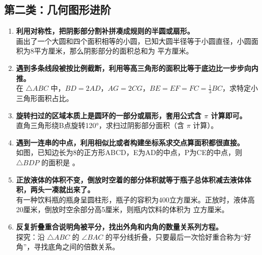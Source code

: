\documentclass{ctexart}
\begin{document}
\subsection*{第二类：几何图形进阶}
\begin{enumerate}
    \item \textbf{利用对称性，把阴影部分割补拼凑成规则的半圆或扇形。} \\
    画出了一个大圆和四个面积相等的小圆，已知大圆半径等于小圆直径，小圆面积为8平方厘米，那么阴影部分的面积总和为 \underline{\hspace{2cm}} 平方厘米。
    \vspace{2cm}
    \vspace{2cm}
    \item \textbf{遇到多条线段被按比例截断，利用等高三角形的面积比等于底边比一步步向内推。} \\
    在 $\triangle ABC$ 中，$BD=2AD$，$AG=2CG$，$BE=EF=FC=\frac{1}{3}BC$，求特定小三角形面积占比。
    \vspace{2cm}
    \vspace{2cm}
    \item \textbf{旋转扫过的区域本质上是圆环的一部分或扇形，套用公式含 $\pi$ 计算即可。} \\
    直角三角形绕B点旋转120°，求扫过阴影部分面积（含 $\pi$ 计算）。
    \vspace{2cm}
    \vspace{2cm}
    \item \textbf{遇到一连串的中点，利用相似比或者构建坐标系求交点算面积都很直接。} \\
    如图，已知边长为8的正方形ABCD，E为AD的中点，P为CE的中点，则 $\triangle BDP$ 的面积是 \underline{\hspace{2cm}}。
    \vspace{2cm}
    \vspace{2cm}
    \item \textbf{正放液体的体积不变，倒放时空着的部分体积就等于瓶子总体积减去液体体积，两头一凑就出来了。} \\
    有一种饮料瓶的瓶身呈圆柱形，瓶子的容积为400立方厘米。正放时，液体高20厘米，倒放时空余部分高5厘米，则瓶内饮料的体积为 \underline{\hspace{2cm}} 立方厘米。
    \vspace{2cm}
    \vspace{2cm}
    \item \textbf{反复折叠重合说明角被平分，找出外角和内角的数量关系列方程。} \\
    探究：沿 $\triangle ABC$ 的 $\angle BAC$ 的平分线折叠，只要最后一次恰好重合称为“好角”，寻找底角之间的倍数关系。
    \vspace{2cm}
    \vspace{2cm}
\end{enumerate}
\end{document}
